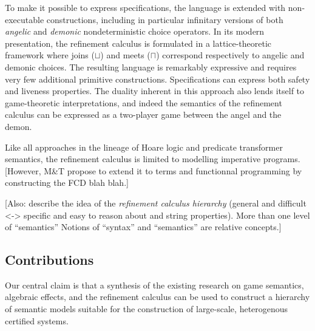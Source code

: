\documentclass[format=sigplan,authordraft]{acmart}
\begin{document}
To make it possible to express specifications,
the language is extended with non-executable constructions,
including in particular infinitary versions of both
\emph{angelic} and \emph{demonic} nondeterministic choice operators.
In its modern presentation,
the refinement calculus is formulated in a lattice-theoretic framework
where joins ($\sqcup$) and meets ($\sqcap$)
correspond respectively to angelic and demonic choices.
The resulting language is remarkably expressive
and requires very few additional primitive constructions.
Specifications can express both safety and liveness properties.
The duality inherent in this approach
also lends itself to game-theoretic interpretations,
and indeed the semantics of the refinement calculus
can be expressed as a two-player game between
the angel and the demon.

Like all approaches in the lineage of Hoare logic
and predicate transformer semantics,
the refinement calculus is limited to
modelling imperative programs.
[However,
M\&T propose to extend it to terms and functionnal programming
by constructing the FCD blah blah.]

[Also: describe the idea of the \emph{refinement calculus hierarchy}
(general and difficult <-> specific and easy to reason about
and string properties).
More than one level of ``semantics''
Notions of ``syntax'' and ``semantics'' are relative concepts.]


\subsection{Contributions}

Our central claim is that a synthesis
of the existing research on
game semantics, algebraic effects, and the refinement calculus
can be used to construct a hierarchy of semantic models
suitable for the construction of large-scale, heterogenous certified systems.
\end{document}

